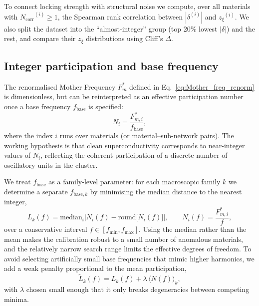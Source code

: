 \documentclass[aps,prb,twocolumn,superscriptaddress,floatfix,nofootinbib]{revtex4-2}
\newcommand{\Ncorr}{\ensuremath{{N_{\mathrm{corr}}}}}
\newcommand{\deltalock}{\ensuremath{\delta}}
\newcommand{\znoise}{\ensuremath{{z_{\xi}}}}
\begin{document}
To connect locking strength with structural noise we compute,
over all materials with $\Ncorr^{(i)} \ge 1$,
the Spearman rank correlation between $|\deltalock^{(i)}|$
and $\znoise^{(i)}$.
We also split the dataset into the ``almost-integer'' group
(top 20\% lowest $|\deltalock|$) and the rest,
and compare their $\znoise$ distributions using Cliff's $\Delta$.

\subsection{Integer participation and base frequency}\label{sec:integer_participation}

The renormalised Mother Frequency \(F_m^*\) defined in
Eq.~\eqref{eq:Mother_freq_renorm} is dimensionless, but can be reinterpreted
as an effective participation number once a base frequency \(f_{\mathrm{base}}\)
is specified:
\begin{equation}
  N_i = \frac{F_{m,i}^*}{f_{\mathrm{base}}},
  \label{eq:integer_participation}
\end{equation}
where the index \(i\) runs over materials (or material–sub-network pairs).
The working hypothesis is that clean superconductivity corresponds to
near-integer values of \(N_i\), reflecting the coherent participation of a
discrete number of oscillatory units in the cluster.

We treat \(f_{\mathrm{base}}\) as a family-level parameter: for each
macroscopic family \(k\) we determine a separate \(f_{\mathrm{base},k}\) by
minimising the median distance to the nearest integer,
\begin{equation}
  L_k(f) = \mathrm{median}_i
           \bigl| N_i(f) - \mathrm{round}\bigl[N_i(f)\bigr] \bigr|,
  \qquad
  N_i(f) = \frac{F_{m,i}^*}{f},
  \label{eq:L_def}
\end{equation}
over a conservative interval \(f\in[f_{\min},f_{\max}]\). Using the median
rather than the mean makes the calibration robust to a small number of
anomalous materials, and the relatively narrow search range limits the
effective degrees of freedom. To avoid selecting artificially small base
frequencies that mimic higher harmonics, we add a weak penalty proportional
to the mean participation,
\begin{equation}
  \tilde L_k(f) = L_k(f) + \lambda\, \langle N(f)\rangle_k,
  \label{eq:L_penalized}
\end{equation}
with \(\lambda\) chosen small enough that it only breaks degeneracies between
competing minima.
\end{document}
